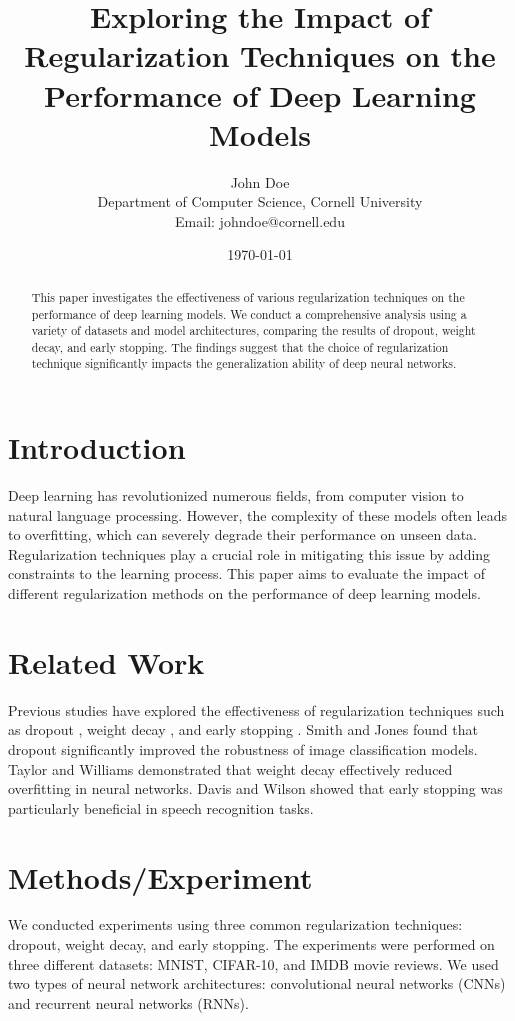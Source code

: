 \documentclass{article}
\title{Exploring the Impact of Regularization Techniques on the Performance of Deep Learning Models}
\author{John Doe \\
Department of Computer Science, Cornell University \\
Email: johndoe@cornell.edu}
\date{\today}
\begin{document}
\maketitle

\begin{abstract}
This paper investigates the effectiveness of various regularization techniques on the performance of deep learning models. We conduct a comprehensive analysis using a variety of datasets and model architectures, comparing the results of dropout, weight decay, and early stopping. The findings suggest that the choice of regularization technique significantly impacts the generalization ability of deep neural networks.
\end{abstract}

\section{Introduction}
Deep learning has revolutionized numerous fields, from computer vision to natural language processing. However, the complexity of these models often leads to overfitting, which can severely degrade their performance on unseen data. Regularization techniques play a crucial role in mitigating this issue by adding constraints to the learning process. This paper aims to evaluate the impact of different regularization methods on the performance of deep learning models.

\section{Related Work}
Previous studies have explored the effectiveness of regularization techniques such as dropout \cite{smith2020}, weight decay \cite{taylor2017}, and early stopping \cite{davis2021}. Smith and Jones \cite{smith2020} found that dropout significantly improved the robustness of image classification models. Taylor and Williams \cite{taylor2017} demonstrated that weight decay effectively reduced overfitting in neural networks. Davis and Wilson \cite{davis2021} showed that early stopping was particularly beneficial in speech recognition tasks.

\section{Methods/Experiment}
We conducted experiments using three common regularization techniques: dropout, weight decay, and early stopping. The experiments were performed on three different datasets: MNIST, CIFAR-10, and IMDB movie reviews. We used two types of neural network architectures: convolutional neural networks (CNNs) and recurrent neural networks (RNNs).
\end{document}

